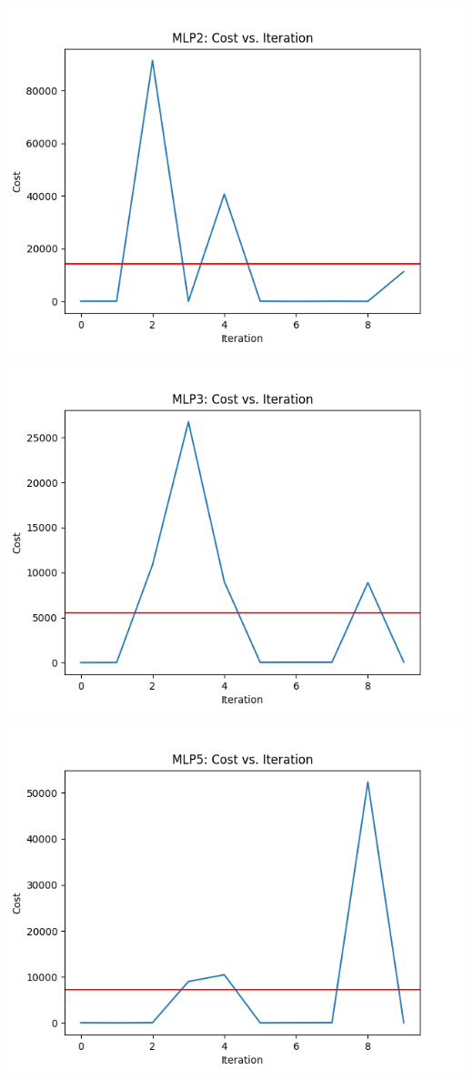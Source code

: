 \documentclass{article}
\begin{document}
\begin{center}
    \includegraphics[scale=0.5]{RR/MLP2.png}
\end{center}
\begin{center}
    \includegraphics[scale=0.5]{RR/MLP3.png}
\end{center}
\begin{center}
    \includegraphics[scale=0.5]{RR/MLP4.png}
\end{center}
\end{document}
